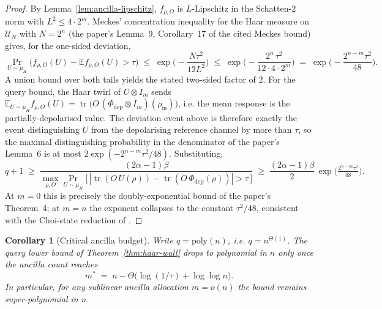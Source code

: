 \documentclass[11pt]{article}
\newtheorem{corollary}{Corollary}
\newcommand{\tr}{\operatorname{tr}}
\begin{document}
\begin{proof}
By Lemma~\ref{lem:ancilla-lipschitz}, $f_{\rho,O}$ is $L$-Lipschitz in the
Schatten-$2$ norm with $L^2 \le 4\cdot 2^m$. Meckes' concentration
inequality for the Haar measure on $\mathcal{U}_{N}$ with $N = 2^n$
(the paper's Lemma~9, Corollary~17 of the cited Meckes bound) gives, for the
one-sided deviation,
\[
  \Pr_{U\sim\mu_H}\!\big(f_{\rho,O}(U) - \mathbb{E}f_{\rho,O}(U) > \tau\big)
  \;\le\;
  \exp\!\Big(-\frac{N\tau^2}{12 L^2}\Big)
  \;\le\;
  \exp\!\Big(-\frac{2^n\,\tau^2}{12 \cdot 4 \cdot 2^m}\Big)
  \;=\;
  \exp\!\Big(-\frac{2^{n-m}\tau^2}{48}\Big).
\]
A union bound over both tails yields the stated two-sided factor of $2$.
For the query bound, the Haar twirl of $U\otimes I_m$ sends
$\mathbb{E}_{U\sim\mu_H}f_{\rho,O}(U)
= \tr\!\big(O\,(\Phi_{\mathrm{dep}}\otimes I_m)(\rho_{\mathrm{in}})\big)$,
i.e. the mean response is the partially-depolarised value. The deviation
event above is therefore exactly the event distinguishing $U$ from the
depolarising reference channel by more than $\tau$, so the maximal
distinguishing probability in the denominator of the paper's Lemma~6 is at
most $2\exp(-2^{n-m}\tau^2/48)$. Substituting,
\[
  q + 1
  \;\ge\;
  \frac{(2\alpha-1)\beta}
       {\displaystyle \max_{\rho,O}\Pr_{U\sim\mu_H}
        \big[\,|\tr(O\,U(\rho)) - \tr(O\,\Phi_{\mathrm{dep}}(\rho))| > \tau\,\big]}
  \;\ge\;
  \frac{(2\alpha-1)\beta}{2}\,
  \exp\!\Big(\tfrac{2^{n-m}\tau^2}{48}\Big).
\]
At $m = 0$ this is precisely the doubly-exponential bound of the paper's
Theorem~4; at $m = n$ the exponent collapses to the constant $\tau^2/48$,
consistent with the Choi-state reduction of
\cite{angrisani2023learningunitaries}.
\end{proof}

\begin{corollary}[Critical ancilla budget]\label{cor:threshold}
Write $q = \mathrm{poly}(n)$, i.e. $q = n^{\Theta(1)}$. The query lower bound
of Theorem~\ref{thm:haar-wall} drops to polynomial in $n$ only once the
ancilla count reaches
\[
  m^\ast \;=\; n - \Theta\!\big(\log(1/\tau) + \log\log n\big).
\]
In particular, for any sublinear ancilla allocation $m = o(n)$ the bound
remains super-polynomial in $n$.
\end{corollary}
\end{document}
